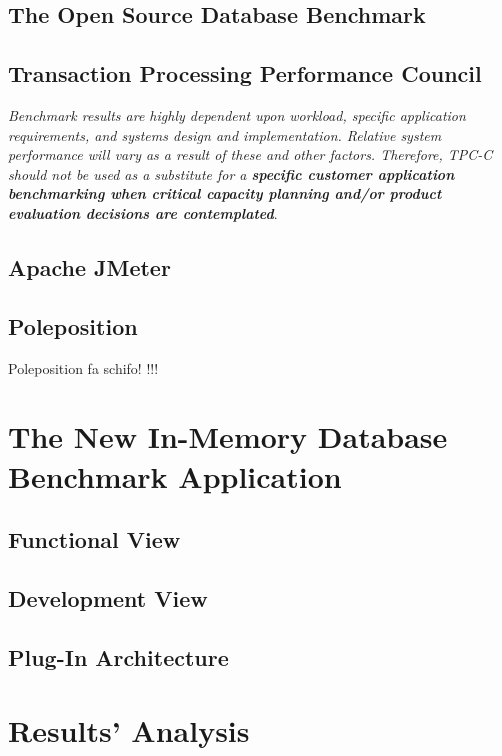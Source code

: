 	\section{The Open Source Database Benchmark}
	
	\section{Transaction Processing Performance Council}
\emph{Benchmark results are highly dependent upon workload, specific application requirements, and systems design and implementation. Relative system performance will vary as a result of these and other factors. Therefore, TPC-C should not be used as a substitute for a \bfseries{specific customer application} benchmarking when critical capacity planning and/or product evaluation decisions are contemplated}\cite{TPC-C}.
	
	\section{Apache JMeter}
	\section{Poleposition}
	Poleposition fa schifo! \cite{poleposition}!!!
	
	
\chapter{The New In-Memory Database Benchmark Application}
	\section{Functional View}
	\section{Development View}
	\section{Plug-In Architecture}

\chapter{Results' Analysis}
